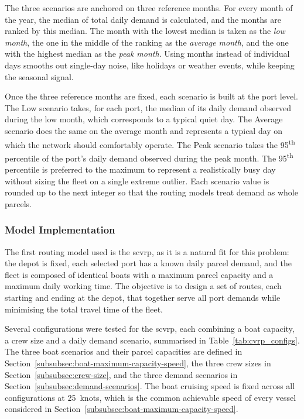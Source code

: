 \documentclass[12pt]{article}
\begin{document}
The three scenarios are anchored on three reference months. For every month of the year, the median of total daily demand is calculated, and the months are ranked by this median. The month with the lowest median is taken as the \textit{low month}, the one in the middle of the ranking as the \textit{average month}, and the one with the highest median as the \textit{peak month}. Using months instead of individual days smooths out single-day noise, like holidays or weather events, while keeping the seasonal signal.

Once the three reference months are fixed, each scenario is built at the port level. The Low scenario takes, for each port, the median of its daily demand observed during the low month, which corresponds to a typical quiet day. The Average scenario does the same on the average month and represents a typical day on which the network should comfortably operate. The Peak scenario takes the 95\textsuperscript{th} percentile of the port's daily demand observed during the peak month. The 95\textsuperscript{th} percentile is preferred to the maximum to represent a realistically busy day without sizing the fleet on a single extreme outlier. Each scenario value is rounded up to the next integer so that the routing models treat demand as whole parcels.

\subsubsection{Model Implementation}
\label{subsubsec:scvrp-implementation}

The first routing model used is the \ac{scvrp}, as it is a natural fit for this problem: the depot is fixed, each selected port has a known daily parcel demand, and the fleet is composed of identical boats with a maximum parcel capacity and a maximum daily working time. The objective is to design a set of routes, each starting and ending at the depot, that together serve all port demands while minimising the total travel time of the fleet.

Several configurations were tested for the \ac{scvrp}, each combining a boat capacity, a crew size and a daily demand scenario, summarised in Table~\ref{tab:cvrp_configs}. The three boat scenarios and their parcel capacities are defined in Section~\ref{subsubsec:boat-maximum-capacity-speed}, the three crew sizes in Section~\ref{subsubsec:crew-size}, and the three demand scenarios in Section~\ref{subsubsec:demand-scenarios}. The boat cruising speed is fixed across all configurations at \qty{25}{knots}, which is the common achievable speed of every vessel considered in Section~\ref{subsubsec:boat-maximum-capacity-speed}.
\end{document}
